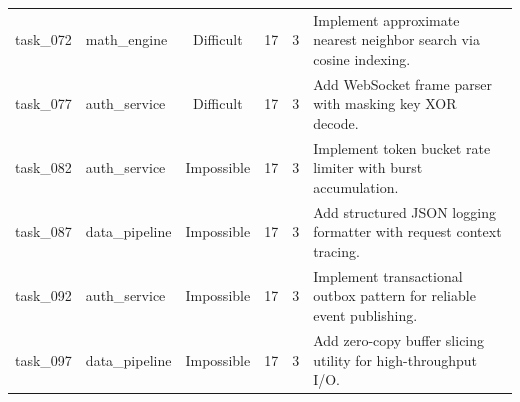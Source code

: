 \begin{table}[t]
\begin{tabular}{llcccl}
task\_072 & math\_engine & Difficult & 17 & 3 & Implement approximate nearest neighbor search via cosine indexing. \\
task\_077 & auth\_service & Difficult & 17 & 3 & Add WebSocket frame parser with masking key XOR decode. \\
task\_082 & auth\_service & Impossible & 17 & 3 & Implement token bucket rate limiter with burst accumulation. \\
task\_087 & data\_pipeline & Impossible & 17 & 3 & Add structured JSON logging formatter with request context tracing. \\
task\_092 & auth\_service & Impossible & 17 & 3 & Implement transactional outbox pattern for reliable event publishing. \\
task\_097 & data\_pipeline & Impossible & 17 & 3 & Add zero-copy buffer slicing utility for high-throughput I/O. \\
\bottomrule
\end{tabular}
\end{table}

